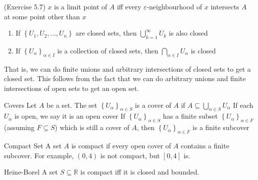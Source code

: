 \documentclass[12pt]{article}
\begin{document}
\begin{example}{(Exercise 5.7)}{}
    $ x $ is a limit point of $ A $ iff every $ \varepsilon $-neighbourhood of $ x $ intersects $ A $ at some point other than $ x $
\end{example}
\begin{proposition}{}{}
    \begin{enumerate}
        \item If $ \left\{ U_1, U_2, \dots, U_n \right\} $ are closed sets, then $ \bigcup_{k = 1}^\infty U_k $ is also closed
        \item If $ \left\{ U_\alpha \right\}_{\alpha \in I} $ is a collection of closed sets, then $ \bigcap_{\alpha \in I} U_\alpha $ is closed
    \end{enumerate}
    That is, we can do finite unions and arbitrary intersections of closed sets to get a closed set. This follows from the fact that we can do arbitrary unions and finite intersections of open sets to get an open set.
\end{proposition}
\begin{definition}{Covers}{}
    Let $ A $ be a set. The set $ \left\{ U_\alpha \right\}_{\alpha \in S} $ is a cover of $ A $ if $ A \subseteq \bigcup_{\alpha \in S} U_\alpha $
    \medskip
    \newline
    If each $ U_\alpha $ is open, we say it is an open cover
    \medskip
    \newline
    If $ \left\{ U_\alpha \right\}_{\alpha \in S} $ has a finite subset $ \left\{ U_\alpha \right\}_{\alpha \in F} $ (assuming $ F \subseteq S $) which is still a cover of $ A $, then $ \left\{ U_\alpha \right\}_{\alpha \in F} $ is a finite subcover
\end{definition}
\begin{definition}{Compact Set}{}
    A set $ A $ is compact if every open cover of $ A $ contains a finite subcover.
    \medskip
    \newline
    For example, $ \left( 0, 4 \right) $ is not compact, but $ \left[ 0, 4 \right] $ is.
\end{definition}
\begin{theorem}{Heine-Borel}{}
    A set $ S \subseteq \mathbb{R} $ is compact iff it is closed and bounded.
\end{theorem}
\end{document}
